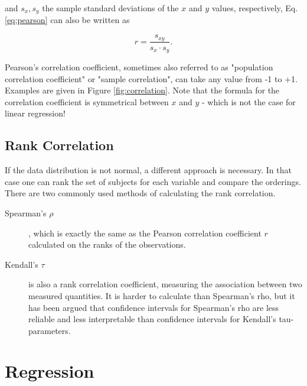 and $s_x, s_y$ the sample standard deviations of the $x$ and $y$ values, respectively,  Eq. \ref{eq:pearson} can also be written as

\begin{equation}
  r = \frac{s_{xy}}{s_x \cdot s_y}.
\end{equation}

Pearson's correlation coefficient, sometimes also referred to as "population correlation coefficient" or "sample correlation", can take any value from -1 to +1. Examples are given in Figure \ref{fig:correlation}. Note that the formula for the correlation coefficient is symmetrical between $x$ and $y$ - which is not the case for linear regression!

\subsection{Rank Correlation}

If the data distribution is not normal, a different approach is necessary. In that case one can rank the set of subjects for each variable and compare the orderings. There are two commonly used methods of calculating the rank correlation. 

\begin{description}
  \item[Spearman's $\rho$], which is exactly the same as the Pearson correlation coefficient $r$ calculated on the ranks of the observations.
  \item[Kendall's $\tau$] is also a rank correlation coefficient, measuring the association between two measured quantities. It is harder to calculate than Spearman's rho, but it has been argued that confidence intervals for Spearman’s rho are less reliable and less interpretable than confidence intervals for Kendall’s tau-parameters.
\end{description}



\section{Regression} 

